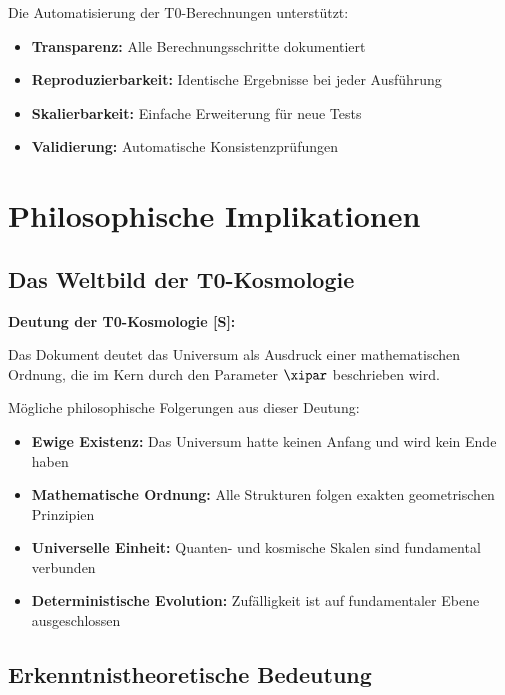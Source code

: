 	Die Automatisierung der T0-Berechnungen unterstützt:
	
	\begin{itemize}
		\item \textbf{Transparenz:} Alle Berechnungsschritte dokumentiert
		\item \textbf{Reproduzierbarkeit:} Identische Ergebnisse bei jeder Ausführung
		\item \textbf{Skalierbarkeit:} Einfache Erweiterung für neue Tests
		\item \textbf{Validierung:} Automatische Konsistenzprüfungen
	\end{itemize}
	
	\section{Philosophische Implikationen}
	
	\subsection{Das Weltbild der T0-Kosmologie}
	
	\begin{revolutionary}[Kernaussage]
		\textbf{Deutung der T0-Kosmologie [S]:}
		
		Das Dokument deutet das Universum als Ausdruck einer mathematischen Ordnung, die im Kern durch den Parameter $\xipar$ beschrieben wird.
	\end{revolutionary}
	
	Mögliche philosophische Folgerungen aus dieser Deutung:
	
	\begin{itemize}
		\item \textbf{Ewige Existenz:} Das Universum hatte keinen Anfang und wird kein Ende haben
		\item \textbf{Mathematische Ordnung:} Alle Strukturen folgen exakten geometrischen Prinzipien
		\item \textbf{Universelle Einheit:} Quanten- und kosmische Skalen sind fundamental verbunden
		\item \textbf{Deterministische Evolution:} Zufälligkeit ist auf fundamentaler Ebene ausgeschlossen
	\end{itemize}
	
	\subsection{Erkenntnistheoretische Bedeutung}
	
